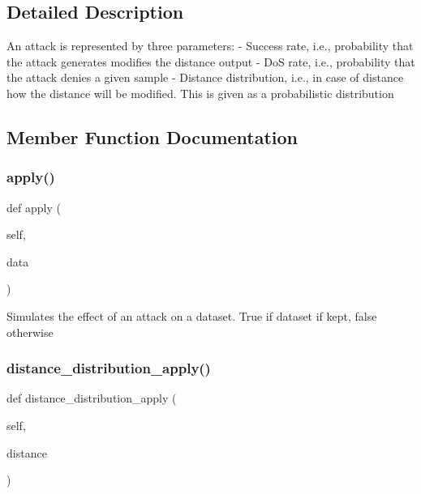 \subsection{Detailed Description}
\begin{DoxyVerb}An attack is represented by three parameters:
    - Success rate, i.e., probability that the attack generates modifies the distance output
    - DoS rate, i.e., probability that the attack denies a given sample
    - Distance distribution, i.e., in case of distance how the distance will be modified. This is given as a probabilistic distribution\end{DoxyVerb}
 

\subsection{Member Function Documentation}
\mbox{\label{class_attacks_1_1_attack_ab16da2c66772b1363a9db1e338f1e445}} 
\subsubsection{\texorpdfstring{apply()}{apply()}}
{\footnotesize\ttfamily def apply (\begin{DoxyParamCaption}\item[{}]{self,  }\item[{}]{data }\end{DoxyParamCaption})}

\begin{DoxyVerb}Simulates the effect of an attack on a dataset. True if dataset if kept, false otherwise\end{DoxyVerb}
 \mbox{\label{class_attacks_1_1_attack_a648687d12cef0a0d27e179d15311187d}} 
\subsubsection{\texorpdfstring{distance\+\_\+distribution\+\_\+apply()}{distance\_distribution\_apply()}}
{\footnotesize\ttfamily def distance\+\_\+distribution\+\_\+apply (\begin{DoxyParamCaption}\item[{}]{self,  }\item[{}]{distance }\end{DoxyParamCaption})}

